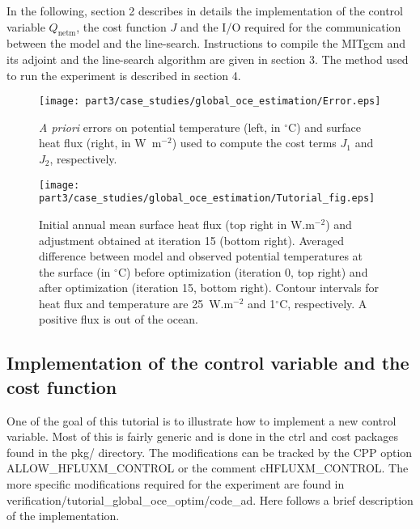 In the following, section 2 describes in details the implementation of the 
control variable $Q_\mathrm{netm}$, the cost function $J$ and the I/O required
for the communication between the model and the line-search. Instructions to
compile the MITgcm and its adjoint and the line-search algorithm are given in
section 3. The method used to run the experiment is described in section 4.

\begin{figure} [tpb]
\begin{center}
\texttt{[image: part3/case\_studies/global\_oce\_estimation/Error.eps]}
\caption{{\it A priori} errors on potential temperature (left, in $^\circ$C) and
surface heat flux (right, in W~m$^{-2}$) used to compute the cost
terms $J_1$ and $J_2$, respectively.} 
\label{Error}
\end{center}
\end{figure}

\begin{figure} [tpb]
\begin{center}
\texttt{[image: part3/case\_studies/global\_oce\_estimation/Tutorial\_fig.eps]}
\caption{Initial annual mean surface heat flux (top right in W.m$^{-2}$) and 
adjustment obtained at iteration 15 (bottom right). Averaged difference
between model and observed potential temperatures at the surface (in $^\circ$C) 
before optimization (iteration 0, top right) and after optimization
(iteration 15, bottom right). Contour intervals for heat flux and temperature
are 25~W.m$^{-2}$ and 1$^\circ$C, respectively. A positive flux is out of the
ocean.}
\label{Results}
\end{center}
\end{figure}

\subsection{Implementation of the control variable and the cost function}

One of the goal of this tutorial is to illustrate how to implement a new
control variable. Most of this is fairly generic and is done in the ctrl
and cost packages found in the pkg/ directory. The modifications can be
tracked by the CPP option ALLOW\_HFLUXM\_CONTROL or the comment
cHFLUXM\_CONTROL. The more specific modifications required for the experiment
are found in verification/tutorial\_global\_oce\_optim/code\_ad. Here follows
a brief description of the implementation.

